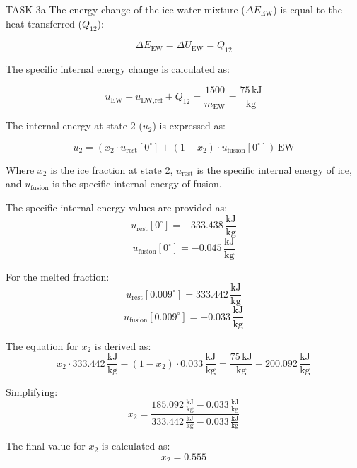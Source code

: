 TASK 3a  
The energy change of the ice-water mixture (\( \Delta E_{\text{EW}} \)) is equal to the heat transferred (\( Q_{12} \)):

\[
\Delta E_{\text{EW}} = \Delta U_{\text{EW}} = Q_{12}
\]

The specific internal energy change is calculated as:

\[
u_{\text{EW}} - u_{\text{EW,ref}} + Q_{12} = \frac{1500}{m_{\text{EW}}} = \frac{75 \, \text{kJ}}{\text{kg}}
\]

The internal energy at state 2 (\( u_2 \)) is expressed as:

\[
u_2 = (x_2 \cdot u_{\text{rest}}[0^\circ] + (1 - x_2) \cdot u_{\text{fusion}}[0^\circ]) \, \text{EW}
\]

Where \( x_2 \) is the ice fraction at state 2, \( u_{\text{rest}} \) is the specific internal energy of ice, and \( u_{\text{fusion}} \) is the specific internal energy of fusion.

The specific internal energy values are provided as:
\[
u_{\text{rest}}[0^\circ] = -333.438 \, \frac{\text{kJ}}{\text{kg}}
\]
\[
u_{\text{fusion}}[0^\circ] = -0.045 \, \frac{\text{kJ}}{\text{kg}}
\]

For the melted fraction:
\[
u_{\text{rest}}[0.009^\circ] = 333.442 \, \frac{\text{kJ}}{\text{kg}}
\]
\[
u_{\text{fusion}}[0.009^\circ] = -0.033 \, \frac{\text{kJ}}{\text{kg}}
\]

The equation for \( x_2 \) is derived as:
\[
x_2 \cdot 333.442 \, \frac{\text{kJ}}{\text{kg}} - (1 - x_2) \cdot 0.033 \, \frac{\text{kJ}}{\text{kg}} = \frac{75 \, \text{kJ}}{\text{kg}} - 200.092 \, \frac{\text{kJ}}{\text{kg}}
\]

Simplifying:
\[
x_2 = \frac{185.092 \, \frac{\text{kJ}}{\text{kg}} - 0.033 \, \frac{\text{kJ}}{\text{kg}}}{333.442 \, \frac{\text{kJ}}{\text{kg}} - 0.033 \, \frac{\text{kJ}}{\text{kg}}}
\]

The final value for \( x_2 \) is calculated as:
\[
x_2 = 0.555
\]